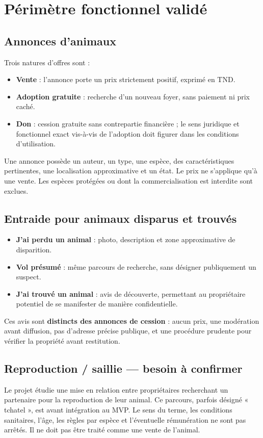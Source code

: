 \section{Périmètre fonctionnel validé}
\subsection{Annonces d’animaux}
Trois natures d’offres sont  :
\begin{itemize}
\item \textbf{Vente} : l’annonce porte un prix strictement positif, exprimé en TND.
\item \textbf{Adoption gratuite} : recherche d’un nouveau foyer, sans paiement ni prix caché.
\item \textbf{Don} : cession gratuite sans contrepartie financière ; le sens juridique et fonctionnel exact vis-à-vis de l’adoption doit figurer dans les conditions d’utilisation.
\end{itemize}
Une annonce possède un auteur, un type, une espèce, des caractéristiques pertinentes, une localisation approximative et un état. Le prix ne s’applique qu’à une vente. Les espèces protégées ou dont la commercialisation est interdite sont exclues.

\subsection{Entraide pour animaux disparus et trouvés}
\begin{itemize}
\item \textbf{J’ai perdu un animal} : photo, description et zone approximative de disparition.
\item \textbf{Vol présumé} : même parcours de recherche, sans désigner publiquement un suspect.
\item \textbf{J’ai trouvé un animal} : avis de découverte, permettant au propriétaire potentiel de se manifester de manière confidentielle.
\end{itemize}
Ces avis sont \textbf{distincts des annonces de cession} : aucun prix, une modération avant diffusion, pas d’adresse précise publique, et une procédure prudente pour vérifier la propriété avant restitution.

\subsection{Reproduction / saillie --- besoin à confirmer}
Le projet étudie une mise en relation entre propriétaires recherchant un partenaire pour la reproduction de leur animal. Ce parcours, parfois désigné « tchatel », est  avant intégration au MVP. Le sens du terme, les conditions sanitaires, l’âge, les règles par espèce et l’éventuelle rémunération ne sont pas arrêtés. Il ne doit pas être traité comme une vente de l’animal.

